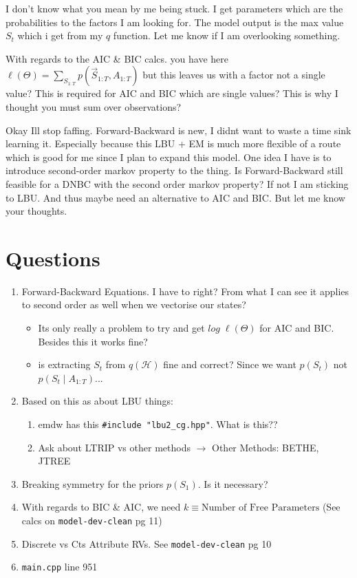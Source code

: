 I don't know what you mean by me being stuck. I get parameters which are the probabilities to the factors I am looking for. The model output is the max value $S_t$ which i get from my $q$ function. Let me know if I am overlooking something.


With regards to the AIC \& BIC calcs. you have here $\ell(\Theta) = \sum_{S_{1:T}} p(\vec{S}_{1:T}, A_{1:T})$ but this leaves us with a factor not a single value? This is required for AIC and BIC which are single values? This is why I thought you must sum over observations?




Okay Ill stop faffing. Forward-Backward is new, I didnt want to waste a time sink learning it. Especially because this LBU + EM is much more flexible of a route which is good for me since I plan to expand this model. One idea I have is to introduce second-order markov property to the thing. Is Forward-Backward still feasible for a DNBC with the second order markov property? If not I am sticking to LBU. And thus maybe need an alternative to AIC and BIC. But let me know your thoughts.


\newpage

\section{Questions}

\begin{enumerate}
    \item Forward-Backward Equations. I have to right? From what I can see it applies to second order as well when we vectorise our states? 
        \begin{itemize}
            \item Its only really a problem to try and get $log \; \ell(\Theta)$ for AIC and BIC. Besides this it works fine? 
            \item is extracting $S_t$ from $q(\mathcal{H})$ fine and correct? Since we want $p(S_t)$ not \\ 
                $p(S_t \mid A_{1:T})$...
        \end{itemize}
    \item Based on this as about LBU things:
        \begin{enumerate}
            \item emdw has this \verb|#include "lbu2_cg.hpp"|. What is this??
            \item Ask about LTRIP vs other methods $\rightarrow$ Other Methods: BETHE, JTREE
        \end{enumerate}
    \item Breaking symmetry for the priors $p(S_1)$. Is it necessary?
    \item With regards to BIC \& AIC, we need $k \equiv \text{Number of Free Parameters}$ (See calcs on \verb|model-dev-clean| pg 11)
    \item Discrete vs Cts Attribute RVs. See \verb|model-dev-clean| pg 10
    \item \verb|main.cpp| line 951

\end{enumerate}






